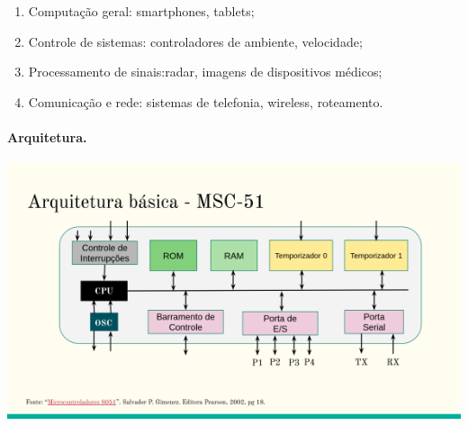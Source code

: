 \begin{enumerate}

	\item Computação geral: smartphones, tablets;
	\item Controle de sistemas: controladores de ambiente, velocidade;
	\item Processamento de sinais:radar, imagens de dispositivos médicos;
	\item Comunicação e rede: sistemas de telefonia, wireless, roteamento.
\end{enumerate}

\paragraph{Arquitetura.}

\begin{center}
\includegraphics[scale=.5]{img/msc51_arch.png}
\end{center}

